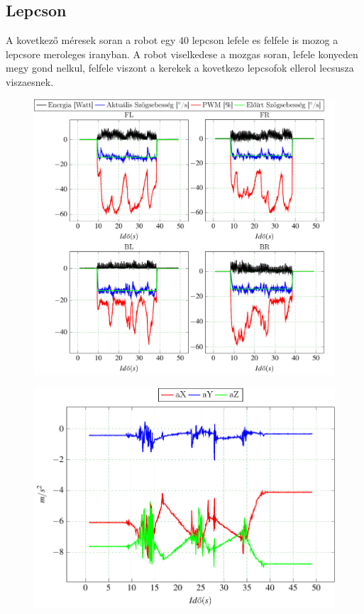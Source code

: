 \subsection{Lepcson}

A kovetkező méresek soran a robot egy 40 \degree lepcson lefele es felfele is mozog a lepcsore meroleges iranyban. A robot viselkedese a mozgas soran, lefele konyeden megy gond nelkul, felfele viszont a kerekek a kovetkezo lepcsofok ellerol lecsusza viszaesnek.


\renewcommand{\GlobalPath}{Meresek/Mozgasok/Lepcso}
\renewcommand{\secondImage}{*} 

%

%


\begin{figure}[H]
  \includegraphics{tikz/LepcsoLexx.pdf}
  \caption{}
  \label{fig:LepcsoLexx}
\end{figure}

\begin{figure}[H]
  \includegraphics{tikz/ImuLepcsoLe1.pdf}
  \caption{}
  \label{fig:ImuLepcsoLe1}
\end{figure}

